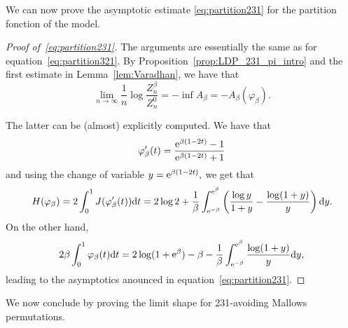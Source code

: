\documentclass[a4paper,11pt]{amsart}
\newcommand{\dd}{\textup{d}}
\newcommand{\ee}{\textup{e}}
\newtheorem{prop}[thm]{Proposition}
\theoremstyle{definition}
\begin{document}
%


We can now prove the asymptotic estimate \eqref{eq:partition231} for the partition fonction of the model.

\begin{proof}[Proof of~\eqref{eq:partition231}]
The arguments are essentially the same as for equation~\eqref{eq:partition321}.
By Proposition~\ref{prop:LDP_231_pi_intro} and the first estimate in Lemma~\ref{lem:Varadhan}, we have that
\[ \lim_{n \rightarrow \infty} \frac{1}{n} \log \frac{Z_n^\beta}{Z_n^0} = -\inf A_\beta = - A_\beta(\varphi_\beta).\]

The latter can be (almost) explicitly computed. We have that
\[ \varphi_\beta'(t) = \frac{\ee^{\beta(1-2t)}-1}{\ee^{\beta(1-2t)}+1}\]
and using the change of variable $ y = \ee^{\beta(1-2t)},$ we get that
\[ H(\varphi_\beta) = 2 \int_0^1 J(\varphi_\beta'(t)) \dd t = 2 \log 2 +  \frac{1}{\beta} \int_{\ee^{-\beta}}^{\ee^{\beta}} \left( \frac{\log y }{1+y} - \frac{\log (1+y) }{y} \right) \dd y.\]
On the other hand,
\[ 2\beta \int_0^1 \varphi_\beta(t) \dd t = 2 \log (1+\ee^\beta) - \beta
- \frac{1}{\beta} \int_{\ee^{-\beta}}^{\ee^{\beta}}  \frac{\log (1+y) }{y} \dd y,\]
leading to the asymptotics anounced in equation~\eqref{eq:partition231}.
\end{proof}



We now conclude by proving the limit shape for 231-avoiding Mallows permutations.
\end{document}
